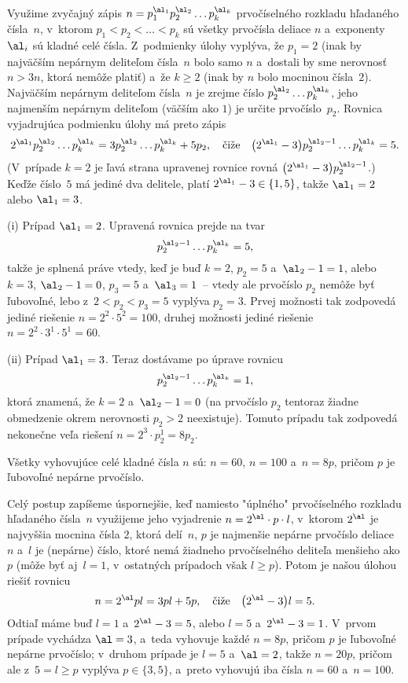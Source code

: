 {%
Využime zvyčajný zápis $n=p_1^{\al_1}p_2^{\al_2}\dots p_k^{\al_k}$
prvočíselného rozkladu hľadaného čísla~$n$,
v~ktorom $p_1<p_2<\dots<p_k$ sú všetky prvočísla deliace $n$
a~exponenty $\al_i$ sú kladné celé čísla.
Z~podmienky úlohy vyplýva, že $p_1=2$ (inak by najväčším nepárnym
deliteľom čísla~$n$ bolo samo $n$ a~dostali by sme nerovnosť $n>3n$,
ktorá nemôže platiť) a~že $k\ge2$ (inak by $n$ bolo mocninou čísla~$2$).
Najväčším nepárnym deliteľom čísla~$n$ je zrejme
číslo $p_2^{\al_2}\dots p_k^{\al_k}$, jeho najmenším nepárnym
deliteľom (väčším ako $1$) je určite prvočíslo~$p_2$. Rovnica
vyjadrujúca podmienku úlohy má preto zápis
$$
2^{\al_1}p_2^{\al_2}\dots
p_k^{\al_k}=3p_2^{\al_2}\dots p_k^{\al_k}+5p_2,\quad\text{čiže}\quad
\bigl(2^{\al_1}-3\bigr)p_2^{\al_2-1}\dots p_k^{\al_k}=5.
$$
(V~prípade $k=2$ je ľavá strana upravenej rovnice
rovná $\bigl(2^{\al_1}-3\bigr)p_2^{\al_2-1}$.)
Keďže číslo~$5$ má jediné dva delitele, platí $2^{\al_1}-3\in\{1,5\}$,
takže $\al_1=2$ alebo $\al_1=3$.

(i) Prípad $\al_1=2$. Upravená rovnica prejde na tvar
$$
p_2^{\al_2-1}\dots p_k^{\al_k}=5,
$$
takže je splnená práve vtedy, keď je buď $k=2$, $p_2=5$ a~$\al_2-1=1$,
alebo $k=3$, $\al_2-1=0$, $p_3=5$ a~$\al_3=1$~--
vtedy ale prvočíslo $p_2$
nemôže byť ľubovoľné, lebo z~$2<p_2<p_3=5$ vyplýva $p_2=3$.
Prvej možnosti tak zodpovedá jediné riešenie $n=2^2\cdot5^2=100$, druhej
možnosti jediné riešenie $n=2^2\cdot3^1\cdot5^1=60$.

(ii) Prípad $\al_1=3$. Teraz dostávame po úprave rovnicu
$$
p_2^{\al_2-1}\dots p_k^{\al_k}=1,
$$
ktorá znamená, že $k=2$ a~$\al_2-1=0$ (na prvočíslo $p_2$
tentoraz žiadne obmedzenie okrem nerovnosti $p_2>2$ neexistuje).
Tomuto prípadu tak zodpovedá nekonečne veľa riešení $n=2^3\cdot p_2^1=8p_2$.

\odpoved
Všetky vyhovujúce celé kladné čísla $n$ sú:
$n=60$, $n=100$ a~$n=8p$, pričom $p$ je ľubovoľné nepárne prvočíslo.

\poznamka
Celý postup zapíšeme úspornejšie, keď namiesto "úplného"
prvočíselného rozkladu hľadaného čísla~$n$ využijeme jeho
vyjadrenie $n=2^{\al}\cdot p\cdot l$, v~ktorom $2^{\al}$ je najvyššia mocnina
čísla $2$, ktorá delí~$n$, $p$ je najmenšie nepárne prvočíslo deliace $n$
a~$l$ je (nepárne) číslo, ktoré nemá žiadneho prvočíselného deliteľa menšieho ako
$p$ (môže byť aj~$l=1$, v~ostatných prípadoch však $l\ge p$).
Potom je našou úlohou riešiť rovnicu
$$
n=2^{\al}pl=3pl+5p,\quad\text{čiže}\quad
\bigl(2^{\al}-3\bigr)l=5.
$$
Odtiaľ máme buď $l=1$ a~$2^{\al}-3=5$, alebo $l=5$ a~$2^{\al}-3=1$.
V~prvom prípade vychádza $\al=3$, a~teda vyhovuje každé $n=8p$,
pričom $p$ je ľubovoľné nepárne prvočíslo; v~druhom prípade je $l=5$ a~$\al=2$, takže $n=20p$, pričom
ale z~$5=l\ge p$ vyplýva $p\in\{3,5\}$, a~preto vyhovujú iba
čísla $n=60$ a~$n=100$.

}
